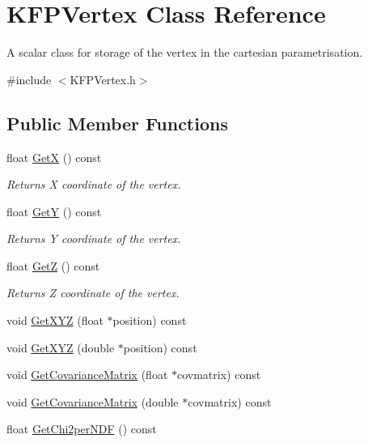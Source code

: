 \hypertarget{classKFPVertex}{}\section{K\+F\+P\+Vertex Class Reference}
\label{classKFPVertex}


A scalar class for storage of the vertex in the cartesian parametrisation.  




{\ttfamily \#include $<$K\+F\+P\+Vertex.\+h$>$}

\subsection*{Public Member Functions}
\begin{DoxyCompactItemize}
\item 
float \hyperlink{classKFPVertex_a5a15225422c34336de1f89773182d389}{GetX} () const \hypertarget{classKFPVertex_a5a15225422c34336de1f89773182d389}{}\label{classKFPVertex_a5a15225422c34336de1f89773182d389}

\begin{DoxyCompactList}\small\item\em Returns X coordinate of the vertex. \end{DoxyCompactList}\item 
float \hyperlink{classKFPVertex_acdd00e757d57875e949329239894c78d}{GetY} () const \hypertarget{classKFPVertex_acdd00e757d57875e949329239894c78d}{}\label{classKFPVertex_acdd00e757d57875e949329239894c78d}

\begin{DoxyCompactList}\small\item\em Returns Y coordinate of the vertex. \end{DoxyCompactList}\item 
float \hyperlink{classKFPVertex_ae30ff55889db2e51bdfef446c730c7dd}{GetZ} () const \hypertarget{classKFPVertex_ae30ff55889db2e51bdfef446c730c7dd}{}\label{classKFPVertex_ae30ff55889db2e51bdfef446c730c7dd}

\begin{DoxyCompactList}\small\item\em Returns Z coordinate of the vertex. \end{DoxyCompactList}\item 
void \hyperlink{classKFPVertex_a32d248f48c1b29dc867a4133e835ae5c}{Get\+X\+YZ} (float $\ast$position) const 
\item 
void \hyperlink{classKFPVertex_afe5ec985311fa968cb673e6c6fea19b9}{Get\+X\+YZ} (double $\ast$position) const 
\item 
void \hyperlink{classKFPVertex_a53026f57dd31dc2e3f43783b89c84eea}{Get\+Covariance\+Matrix} (float $\ast$covmatrix) const 
\item 
void \hyperlink{classKFPVertex_a252f921b95faba943598230924c1ea6e}{Get\+Covariance\+Matrix} (double $\ast$covmatrix) const 
\item 
float \hyperlink{classKFPVertex_a2418610813ce90a9e8ab2eab946d5e57}{Get\+Chi2per\+N\+DF} () const \hypertarget{classKFPVertex_a2418610813ce90a9e8ab2eab946d5e57}{}\label{classKFPVertex_a2418610813ce90a9e8ab2eab946d5e57}


\end{DoxyCompactItemize}
